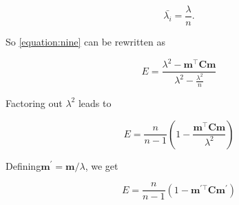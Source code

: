 {\begin{equation}
    \bar{\lambda_i} = \frac{\lambda}{n}.
\end{equation}

\noindent So \autoref{equation:nine} can be rewritten as

\begin{equation}
    E=\frac{\lambda^2-\boldsymbol{m}^{\top}\boldsymbol{C}\boldsymbol{m}}{\lambda^2-\frac{\lambda^2}{n}}
\end{equation}

\noindent Factoring out $\lambda^2$ leads to

\begin{equation}
        E=\frac{n}{n-1}(1 - \frac{\boldsymbol{m}^{\top}\boldsymbol{C}\boldsymbol{m}}{\lambda^2})
\end{equation}

\noindent Defining$\boldsymbol{m}^{\prime} = \boldsymbol{m} / \lambda$, we get

\begin{equation}
    \boxed{E=\frac{n}{n-1}(1 - \boldsymbol{m}^{\prime\top}\boldsymbol{C}\boldsymbol{m}^{\prime})}
\end{equation}
}

